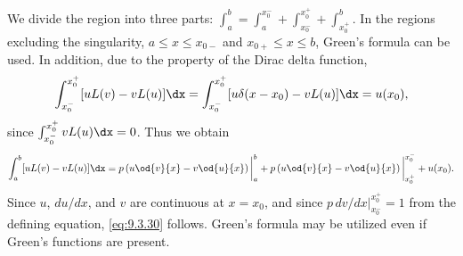 We divide the region into three parts: $\int_a^b = \int_a^{x_0^-} + \int_{x_0^-}^{x_0^+} + \int_{x_0^+}^b$.  In the regions excluding the singularity, $a \le x \le x_{0-}$ and $x_{0+} \le x \le b$, Green's formula can be used.  In addition, due to the property of the Dirac delta function,
\[
\int_{x_0^-}^{x_0^+} [uL(v) - vL(u)]\dx = \int_{x_0^-}^{x_0^+} [u\delta(x-x_0) - vL(u)]\dx = u(x_0),
\]
since $\int_{x_0^-}^{x_0^+} vL(u)\dx = 0$.  Thus we obtain
\begin{equation}
\label{eq:9.3.31}
\int_a^b [uL(v) - vL(u)]\dx = p\left(u\od{v}{x} - v\od{u}{x}\right)\bigg|_a^b + p\left(u\od{v}{x} - v\od{u}{x}\right)\bigg|_{x_0^+}^{x_0^-} + u(x_0).
\end{equation}
Since $u$, $du/dx$, and $v$ are continuous at $x = x_0$, and since $p\,dv/dx|_{x_0^-}^{x_0^+} = 1$ from the defining equation, \eqref{eq:9.3.30} follows.  Green's formula may be utilized even if Green's functions are present.


